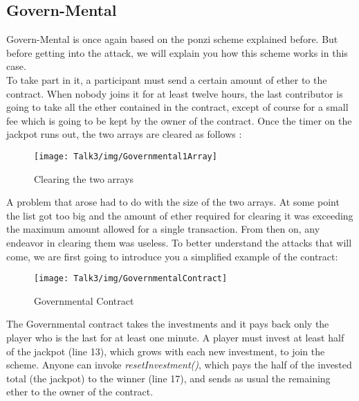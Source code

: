 \subsection{Govern-Mental}
Govern-Mental is once again based on the ponzi scheme explained before. But before getting into the attack, we will explain you how this scheme works in this case.\\
To take part in it, a participant must send a  certain amount of ether to the contract. When nobody joins it for at least twelve hours, the last contributor is going to take all the ether contained in the contract, except of course for a small fee which is going to be kept by the owner of the contract.
Once the timer on the jackpot runs out, the two arrays are cleared as follows \cite{paper2}:
\begin{figure}[H]
\begin{center}
\texttt{[image: Talk3/img/Governmental1Array]}
\end{center}
\caption{Clearing the two arrays}
\label{label}
\end{figure}
A problem that arose had to do with the size of the two arrays. At some point the list got too big and the amount of ether required for clearing it was exceeding the maximum amount allowed for a single transaction. From then on, any endeavor in clearing them was useless.
To better understand the attacks that will come, we are first going to introduce you a simplified example of the contract:
\begin{figure}[H]
\begin{center}
\texttt{[image: Talk3/img/GovernmentalContract]}
\end{center}
\caption{Governmental Contract}
\label{label}
\end{figure}
The Governmental contract takes the investments and it pays back only the player who is the last for at least one minute. A player must invest at least half of the jackpot (line 13), which grows with each new investment, to join the scheme. Anyone can invoke \textit{resetInvestment()}, which pays the half of the invested total (the jackpot) to the winner (line 17), and sends as usual the remaining ether to the owner of the contract.
